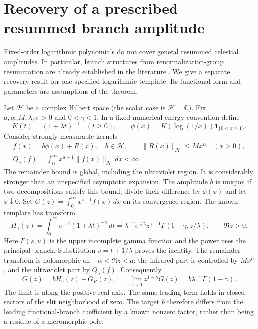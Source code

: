 \section{Recovery of a prescribed resummed branch amplitude}
\label{sec:branch}
Fixed-order logarithmic polynomials do not cover general resummed celestial
amplitudes. In particular, branch structures from renormalization-group
resummation are already established in the literature \cite{gu}.
We give a separate recovery result for one specified logarithmic template.
Its functional form and parameters are assumptions of the theorem.

Let $\mathcal H$ be a complex Hilbert space (the scalar case is
$\mathcal H=\mathbb C$). Fix $a,\alpha,M,\lambda,\sigma>0$ and
$0<\gamma<1$. In a fixed numerical energy convention define
\begin{equation}\label{eq:branchtemplate}
 K(t)=(1+\lambda t)^{-\gamma}\quad(t\ge0),\qquad
 \phi(x)=K(\log(1/x))\mathbf1_{\{0<x\le1\}}.
\end{equation}
Consider strongly measurable kernels
\begin{equation}\label{eq:branchclass}
 \begin{gathered}
 f(x)=b\phi(x)+R(x),\quad b\in\mathcal H,\qquad
 \|R(x)\|_{\mathcal H}\le Mx^\alpha\quad(x>0),\\
 Q_a(f)=\int_0^\infty x^{a-1}\|f(x)\|_{\mathcal H}\,dx<\infty.
 \end{gathered}
\end{equation}
The remainder bound is global, including the ultraviolet region. It is
considerably stronger than an unspecified asymptotic expansion. The amplitude
$b$ is unique: if two decompositions satisfy this bound, divide their
difference by $\phi(x)$ and let $x\downarrow0$.
Set $G(z)=\int_0^\infty x^{z-1}f(x)\,dx$ on its convergence region.
The known template has transform
\begin{equation}\label{eq:branchtransform}
 H_\gamma(z)=\int_0^\infty e^{-zt}(1+\lambda t)^{-\gamma}\,dt
 =\lambda^{-\gamma}e^{z/\lambda}z^{\gamma-1}
   \Gamma(1-\gamma,z/\lambda),\qquad \Re z>0.
\end{equation}
Here $\Gamma(s,u)$ is the upper incomplete gamma function and the power uses
the principal branch. Substitution $v=t+1/\lambda$ proves the identity.
The remainder transform is holomorphic on $-\alpha<\Re z<a$:
the infrared part is controlled by $Mx^\alpha$, and the ultraviolet part
by $Q_a(f)$. Consequently
\begin{equation}\label{eq:branchcoefficient}
 G(z)=bH_\gamma(z)+G_R(z),\qquad
 \lim_{z\downarrow0}z^{1-\gamma}G(z)
 =b\lambda^{-\gamma}\Gamma(1-\gamma).
\end{equation}
The limit is along the positive real axis. The same leading term holds in
closed sectors of the slit neighborhood of zero. The target $b$ therefore
differs from the leading fractional-branch coefficient by a known nonzero
factor, rather than being a residue of a meromorphic pole.

